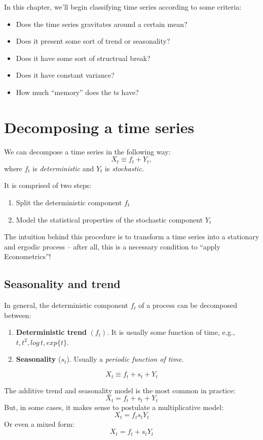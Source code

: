 \documentclass[11pt, a4paper]{report}
\theoremstyle{plain}
\theoremstyle{plain}
\theoremstyle{remark}
\begin{document}
In this chapter, we'll begin classifying time series according to some criteria:
\begin{itemize}
	\item Does the time series gravitates around a certain mean?
	\item Does it present some sort of trend or seasonality?
	\item Does it have some sort of structrual break?
	\item Does it have constant variance?
	\item How much ``memory'' does the ts have?
\end{itemize}

\section{Decomposing a time series}

We can decompose a time series in the following way:
$$ X_t \equiv f_t + Y_t,$$
where $f_t$ is \textit{deterministic} and $Y_t$ is \textit{stochastic.}

It is comprised of two steps:
\begin{enumerate}
	\item Split the deterministic component $f_t$
	\item Model the statistical properties of the stochastic component $Y_t$
\end{enumerate}

The intuition behind this procedure is to transform a time series into a stationary and ergodic process -- after all, this is a necessary condition to ``apply Econometrics''!

\subsection{Seasonality and trend}

In general, the deterministic component $f_t$ of a process can be decomposed between:
\begin{enumerate}
	\item \textbf{Deterministic trend} $(f_t)$. It is usually some function of time, e.g., $t, t^2, log \, t, exp \{t\}$.
	\item \textbf{Seasonality} ($s_t$). Usually a \textit{periodic function of time}.
\end{enumerate}
$$ X_t \equiv f_t + s_t + Y_t $$

The additive trend and seasonality model is the most common in practice:
$$ X_t = f_t + s_t + Y_t $$
But, in some cases, it makes sense to postulate a multiplicative model:
$$ X_t = f_t s_t Y_t $$
Or even a mixed form:
$$ X_t = f_t + s_t Y_t $$
\end{document}

